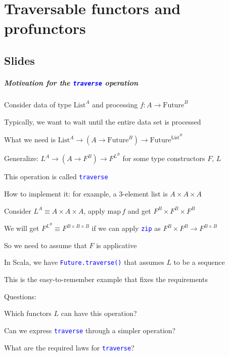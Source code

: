 
\chapter{Traversable functors and profunctors\label{chap:9-Traversable-functors-and}}

\section{Slides}

\paragraph{Motivation for the \texttt{\textcolor{blue}{\footnotesize{}traverse}}
operation}

Consider data of type $\text{List}^{A}$ and processing $f:A\rightarrow\text{Future}^{B}$

Typically, we want to wait until the entire data set is processed

What we need is $\text{List}^{A}\rightarrow\left(A\rightarrow\text{Future}^{B}\right)\rightarrow\text{Future}^{\text{List}^{B}}$

Generalize: $L^{A}\rightarrow\left(A\rightarrow F^{B}\right)\rightarrow F^{L^{B}}$
for some type constructors $F$, $L$

This operation is called \texttt{\textcolor{blue}{\footnotesize{}traverse}} 

How to implement it: for example, a 3-element list is $A\times A\times A$

Consider $L^{A}\equiv A\times A\times A$, apply $\text{map}\,f$
and get $F^{B}\times F^{B}\times F^{B}$

We will get $F^{L^{B}}\equiv F^{B\times B\times B}$ if we can apply
\texttt{\textcolor{blue}{\footnotesize{}zip}} as $F^{B}\times F^{B}\rightarrow F^{B\times B}$

So we need to assume that $F$ is applicative

In Scala, we have \texttt{\textcolor{blue}{\footnotesize{}Future.traverse()}}
that assumes $L$ to be a sequence

This is the easy-to-remember example that fixes the requirements

Questions:

Which functors $L$ can have this operation?

Can we express \texttt{\textcolor{blue}{\footnotesize{}traverse}}
through a simpler operation?

What are the required laws for \texttt{\textcolor{blue}{\footnotesize{}traverse}}?

